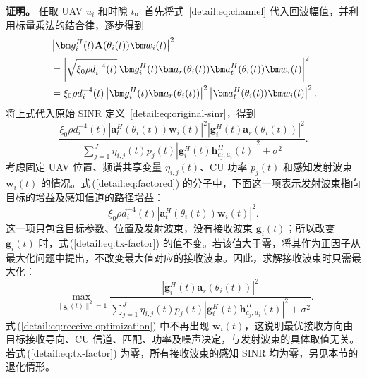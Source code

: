 \medskip
\noindent\textbf{证明。}
任取 UAV $u_i$ 和时隙 $t$。首先将式~\eqref{detail:eq:channel} 代入回波幅值，并利用标量乘法的结合律，逐步得到
\begin{align}
&\left|\bm g_i^H(t)\mathbf A(\theta_i(t))\bm w_i(t)\right|^2\notag\\
&=\left|\sqrt{\xi_0\rho d_i^{-4}(t)}\,
\bm g_i^H(t)\bm a_r(\theta_i(t))\bm a_t^H(\theta_i(t))\bm w_i(t)\right|^2\notag\\
&=\xi_0\rho d_i^{-4}(t)
\left|\bm g_i^H(t)\bm a_r(\theta_i(t))\right|^2
\left|\bm a_t^H(\theta_i(t))\bm w_i(t)\right|^2.\label{detail:eq:factor}
\end{align}
将上式代入原始 SINR 定义~\eqref{detail:eq:original-sinr}，得到
\begin{equation}\label{detail:eq:factored}
\frac{\xi_0\rho d_i^{-4}(t)
\left|\bm a_t^H(\theta_i(t))\bm w_i(t)\right|^2
\left|\bm g_i^H(t)\bm a_r(\theta_i(t))\right|^2}
{\displaystyle\sum_{j=1}^J\eta_{i,j}(t)p_j(t)
\left|\bm g_i^H(t)\bm h_{c_j,u_i}^{H}(t)\right|^2+\sigma^2}.
\end{equation}
考虑固定 UAV 位置、频谱共享变量 $\eta_{i,j}(t)$、CU 功率 $p_j(t)$ 和感知发射波束 $\bm w_i(t)$ 的情况。式\,(\ref{detail:eq:factored}) 的分子中，下面这一项表示发射波束指向目标的增益及感知信道的路径增益：
\begin{equation}\label{detail:eq:tx-factor}
\xi_0\rho d_i^{-4}(t)
\left|\bm a_t^H(\theta_i(t))\bm w_i(t)\right|^2.
\end{equation}
这一项只包含目标参数、位置及发射波束，没有接收波束 $\bm g_i(t)$；所以改变 $\bm g_i(t)$ 时，式\,(\ref{detail:eq:tx-factor}) 的值不变。若该值大于零，将其作为正因子从最大化问题中提出，不改变最大值对应的接收波束。因此，求解接收波束时只需最大化：
\begin{equation}\label{detail:eq:receive-optimization}
\max_{\|\bm g_i(t)\|^2=1}
\frac{\left|\bm g_i^H(t)\bm a_r(\theta_i(t))\right|^2}
{\displaystyle\sum_{j=1}^J\eta_{i,j}(t)p_j(t)
\left|\bm g_i^H(t)\bm h_{c_j,u_i}^{H}(t)\right|^2+\sigma^2}.
\end{equation}
式\,(\ref{detail:eq:receive-optimization}) 中不再出现 $\bm w_i(t)$，这说明最优接收方向由目标接收导向、CU 信道、匹配、功率及噪声决定，与发射波束的具体取值无关。若式\,(\ref{detail:eq:tx-factor}) 为零，所有接收波束的感知 SINR 均为零，另见本节的退化情形。

